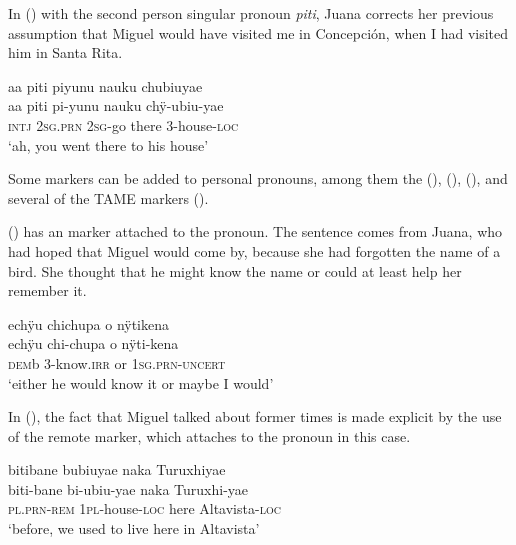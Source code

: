 In () with the second person singular pronoun \textit{piti}, Juana corrects her previous assumption that Miguel would have visited me in Concepción, when I had visited him in Santa Rita.

\ea\label{ex:PersPron-2}
\begingl
\glpreamble aa piti piyunu nauku chubiuyae\\
\gla aa piti pi-yunu nauku chÿ-ubiu-yae\\
\glb \textsc{intj} 2\textsc{sg.prn} 2\textsc{sg}-go there 3-house-\textsc{loc}\\
\glft ‘ah, you went there to his house’
\endgl
\trailingcitation{[jxx-e110923l-1.028]}
\xe

Some markers can be added to personal pronouns, among them the  (),  (),  (), and several of the TAME markers ().

() has an  marker attached to the pronoun. The sentence comes from Juana, who had hoped that Miguel would come by, because she had forgotten the name of a bird. She thought that he might know the name or could at least help her remember it.

\ea\label{ex:PersPron-5}
\begingl
\glpreamble echÿu chichupa o nÿtikena\\
\gla echÿu chi-chupa o nÿti-kena\\
\glb \textsc{dem}b 3-know.\textsc{irr} or 1\textsc{sg.prn}-\textsc{uncert}\\
\glft ‘either he would know it or maybe I would’
\endgl
\trailingcitation{[jxx-p120430l-1.094]}
\xe

In (), the fact that Miguel talked about former times is made explicit by the use of the remote marker, which attaches to the pronoun in this case.

\ea\label{ex:PersPron-4}
\begingl
\glpreamble bitibane bubiuyae naka Turuxhiyae\\
\gla biti-bane bi-ubiu-yae naka Turuxhi-yae\\
\textsc{pl.prn}-\textsc{rem} 1\textsc{pl}-house-\textsc{loc} here Altavista-\textsc{loc}\\
\glft ‘before, we used to live here in Altavista’
\endgl
\trailingcitation{[mxx-p110825l.012]}
\xe

